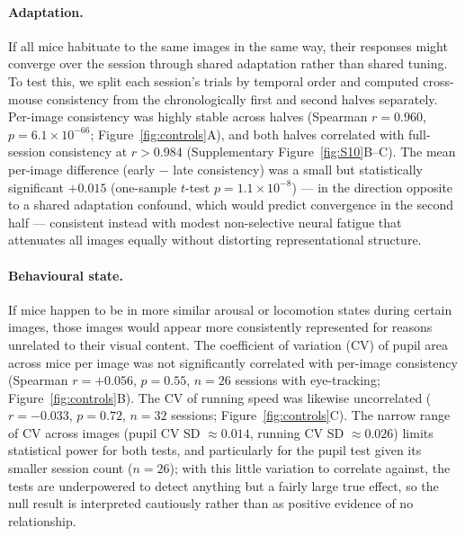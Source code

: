 \documentclass[11pt,onecolumn]{article}
\begin{document}
\paragraph{Adaptation.}
If all mice habituate to the same images in the same way, their responses
might converge over the session through shared adaptation rather than
shared tuning.  To test this, we split each session's trials by temporal
order and computed cross-mouse consistency from the chronologically first
and second halves separately.  Per-image consistency was highly stable
across halves (Spearman $r = 0.960$, $p = 6.1 \times 10^{-66}$;
Figure~\ref{fig:controls}A), and both halves correlated with full-session
consistency at $r > 0.984$ (Supplementary Figure~\ref{fig:S10}B--C).  The
mean per-image difference (early $-$ late consistency) was a small but
statistically significant $+0.015$ (one-sample $t$-test
$p = 1.1 \times 10^{-8}$) --- in the direction opposite to a shared
adaptation confound, which would predict convergence in the second half
--- consistent instead with modest non-selective neural fatigue that
attenuates all images equally without distorting representational
structure.

\paragraph{Behavioural state.}
If mice happen to be in more similar arousal or locomotion states during
certain images, those images would appear more consistently represented
for reasons unrelated to their visual content.  The coefficient of
variation (CV) of pupil area across mice per image was not significantly
correlated with per-image consistency (Spearman $r = +0.056$, $p = 0.55$,
$n = 26$ sessions with eye-tracking; Figure~\ref{fig:controls}B).  The CV
of running speed was likewise uncorrelated ($r = -0.033$, $p = 0.72$,
$n = 32$ sessions; Figure~\ref{fig:controls}C).  The narrow range of CV
across images (pupil CV SD $\approx 0.014$, running CV SD
$\approx 0.026$) limits statistical power for both tests, and
particularly for the pupil test given its smaller session count
($n = 26$); with this little variation to correlate against, the tests
are underpowered to detect anything but a fairly large true effect, so
the null result is interpreted cautiously rather than as positive
evidence of no relationship.
\end{document}
